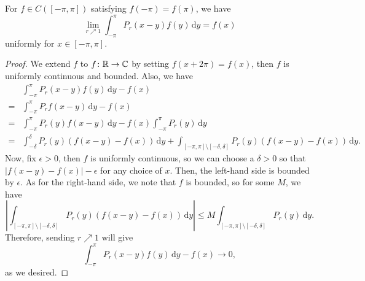 \begin{lemma}
	For \(f\in C([-\pi , \pi ])\)  satisfying \(f(-\pi) = f(\pi )\), we have
	\[
		\lim\limits_{r \nearrow 1} \int _{-\pi }^\pi P_{r} (x - y)f(y)\,\mathrm{d} y = f(x)
	\]
	uniformly for \(x\in [-\pi , \pi ]\).
\end{lemma}
\begin{proof}
	We extend \(f\) to \(f\colon \mathbb{\MakeUppercase{r}} \to \mathbb{\MakeUppercase{c}} \) by setting \(f(x + 2\pi ) = f(x)\), then \(f\) is
	uniformly continuous and bounded. Also, we have
	\[
		\begin{split}
			&\int _{-\pi }^\pi P_{r} (x - y)f(y)\,\mathrm{d} y - f(x)\\
			= &\int _{-\pi }^\pi P_{r} f(x-y)\,\mathrm{d} y - f(x)\\
			= &\int _{-\pi }^\pi P_{r} (y) f(x-y) \,\mathrm{d} y - f(x)\int _{-\pi }^\pi P_{r} (y)\,\mathrm{d} y\\
			= &\int _{-\delta }^\delta P_{r} (y)(f(x-y) - f(x))\,\mathrm{d} y + \int _{[-\pi , \pi ]\setminus [-\delta , \delta ]}P_{r} (y)(f(x-y) - f(x))\,\mathrm{d} y.
		\end{split}
	\]
	Now, fix \(\epsilon >0\), then \(f\) is uniformly continuous, so we can choose a \(\delta >0\) so that \(\left\vert f(x-y)-f(x) \right\vert -\epsilon \) for
	any choice of \(x\). Then, the left-hand side is bounded by \(\epsilon \). As for the right-hand side, we note that \(f\) is bounded, so for some \(M\),
	we have
	\[
		\left\vert \int _{[-\pi , \pi ]\setminus [-\delta , \delta ]}P_{r} (y)(f(x-y)-f(x)) \,\mathrm{d} y\right\vert \leq M \int _{[-\pi , \pi ]\setminus [-\delta , \delta ]}P_{r} (y)\,\mathrm{d} y.
	\]
	Therefore, sending \(r \nearrow 1\) will give
	\[
		\int _{-\pi }^\pi P_{r} (x-y)f(y)\,\mathrm{d} y - f(x) \to 0,
	\]
	as we desired.
\end{proof}